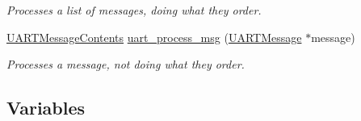 \begin{DoxyCompactItemize}
\begin{DoxyCompactList}\small\item\em Processes a list of messages, doing what they order. \end{DoxyCompactList}\item 
\mbox{\hyperlink{struct_u_a_r_t_message_contents}{U\+A\+R\+T\+Message\+Contents}} \mbox{\hyperlink{group__uart__wordgame_gaa1fdee09f3f9af28335a782b49fafffe}{uart\+\_\+process\+\_\+msg}} (\mbox{\hyperlink{struct_u_a_r_t_message}{U\+A\+R\+T\+Message}} $\ast$message)
\begin{DoxyCompactList}\small\item\em Processes a message, not doing what they order. \end{DoxyCompactList}\end{DoxyCompactItemize}
\subsection*{Variables}

